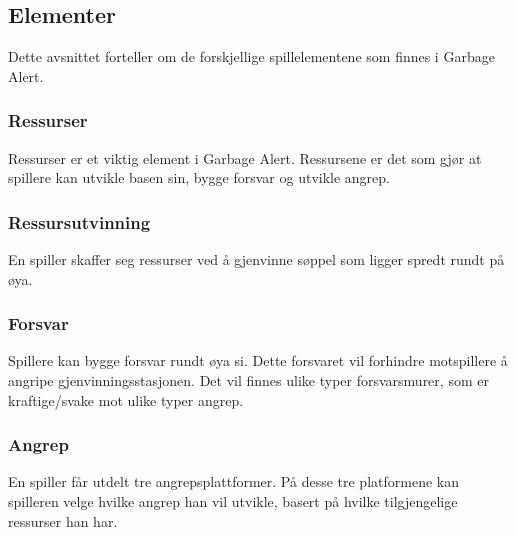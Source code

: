 

\subsection{Elementer}
Dette avsnittet forteller om de forskjellige spillelementene som finnes
i Garbage Alert.
\subsubsection{Ressurser}
Ressurser er et viktig element i Garbage Alert. Ressursene er det som
gjør at spillere kan utvikle basen sin, bygge forsvar og utvikle angrep.
\subsubsection{Ressursutvinning}
En spiller skaffer seg ressurser ved å gjenvinne søppel som ligger
spredt rundt på øya.
\subsubsection{Forsvar}
Spillere kan bygge forsvar rundt øya si. Dette forsvaret vil forhindre
motspillere å angripe gjenvinningsstasjonen. Det vil finnes ulike typer
forsvarsmurer, som er kraftige/svake mot ulike typer angrep.
\subsubsection{Angrep}
En spiller får utdelt tre angrepsplattformer. På desse tre platformene
kan spilleren velge hvilke angrep han vil utvikle, basert på hvilke
tilgjengelige ressurser han har.

